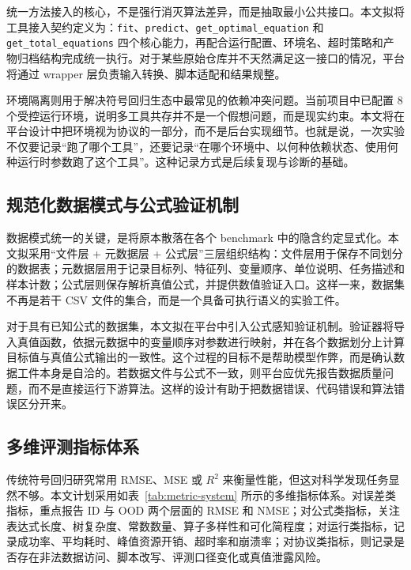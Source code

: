 \documentclass[UTF8,12pt]{ctexart}
\begin{document}
统一方法接入的核心，不是强行消灭算法差异，而是抽取最小公共接口。本文拟将工具接入契约定义为：\texttt{fit}、\texttt{predict}、\texttt{get\_optimal\_equation} 和 \texttt{get\_total\_equations} 四个核心能力，再配合运行配置、环境名、超时策略和产物归档结构完成统一执行。对于某些原始仓库并不天然满足这一接口的情况，平台将通过 wrapper 层负责输入转换、脚本适配和结果规整。

环境隔离则用于解决符号回归生态中最常见的依赖冲突问题。当前项目中已配置 $8$ 个受控运行环境，说明多工具共存并不是一个假想问题，而是现实约束。本文将在平台设计中把环境视为协议的一部分，而不是后台实现细节。也就是说，一次实验不仅要记录“跑了哪个工具”，还要记录“在哪个环境中、以何种依赖状态、使用何种运行时参数跑了这个工具”。这种记录方式是后续复现与诊断的基础。

\subsection{规范化数据模式与公式验证机制}

数据模式统一的关键，是将原本散落在各个 benchmark 中的隐含约定显式化。本文拟采用“文件层 + 元数据层 + 公式层”三层组织结构：文件层用于保存不同划分的数据表；元数据层用于记录目标列、特征列、变量顺序、单位说明、任务描述和样本计数；公式层则保存解析真值公式，并提供数值验证入口。这样一来，数据集不再是若干 CSV 文件的集合，而是一个具备可执行语义的实验工件。

对于具有已知公式的数据集，本文拟在平台中引入公式感知验证机制。验证器将导入真值函数，依据元数据中的变量顺序对参数进行映射，并在各个数据划分上计算目标值与真值公式输出的一致性。这个过程的目标不是帮助模型作弊，而是确认数据工件本身是自洽的。若数据文件与公式不一致，则平台应优先报告数据质量问题，而不是直接运行下游算法。这样的设计有助于把数据错误、代码错误和算法错误区分开来。

\subsection{多维评测指标体系}

传统符号回归研究常用 RMSE、MSE 或 $R^2$ 来衡量性能，但这对科学发现任务显然不够。本文计划采用如表~\ref{tab:metric-system} 所示的多维指标体系。对误差类指标，重点报告 ID 与 OOD 两个层面的 RMSE 和 NMSE；对公式类指标，关注表达式长度、树复杂度、常数数量、算子多样性和可化简程度；对运行类指标，记录成功率、平均耗时、峰值资源开销、超时率和崩溃率；对协议类指标，则记录是否存在非法数据访问、脚本改写、评测口径变化或真值泄露风险。
\end{document}
